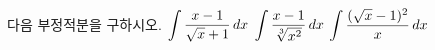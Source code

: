 다음 부정적분을 구하시오.
 $\displaystyle\int \dfrac{x-1}{\sqrt{x}+1}\mkern3mu dx$
 $\displaystyle\int \dfrac{x-1}{\sqrt[3]{x^2}}\mkern3mu dx$
 $\displaystyle\int \dfrac{(\sqrt{x}-1)^2}{x}\mkern3mu dx$
